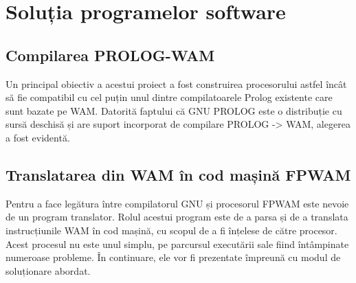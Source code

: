 \documentclass[12pt,a4paper,twoside]{report}
\begin{document}
\section{Soluția programelor software}
\subsection{Compilarea PROLOG-WAM}
Un principal obiectiv a acestui proiect a fost construirea procesorului astfel încât să fie compatibil cu cel puțin unul dintre compilatoarele Prolog existente care sunt bazate pe WAM. Datorită faptului că GNU PROLOG este o distribuție cu sursă deschisă și are suport incorporat de compilare PROLOG -> WAM, alegerea a fost evidentă.
\subsection{Translatarea din WAM în cod mașină FPWAM}
Pentru a face legătura între compilatorul GNU și procesorul FPWAM este nevoie de un program translator. Rolul acestui program este de a parsa și de a translata instrucțiunile WAM în cod mașină, cu scopul de a fi înțelese de către procesor. Acest procesul nu este unul simplu, pe parcursul executării sale fiind întâmpinate numeroase probleme. În continuare, ele vor fi prezentate împreună cu modul de soluționare abordat.
\end{document}
